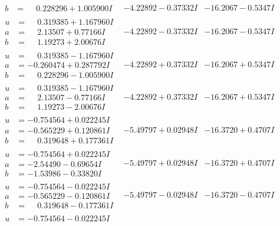 \documentclass[1p]{elsarticle_modified}
\theoremstyle{definition}
\begin{document}
$$\begin{array}{c|c|c}
\begin{aligned}
b &= \phantom{-}0.228296 + 1.005900 I\end{aligned}
 & -4.22892 - 0.37332 I & -16.2067 - 0.5347 I \\ \hline\begin{aligned}
u &= \phantom{-}0.319385 + 1.167960 I \\
a &= \phantom{-}2.13507 + 0.77166 I \\
b &= \phantom{-}1.19273 + 2.00676 I\end{aligned}
 & -4.22892 - 0.37332 I & -16.2067 - 0.5347 I \\ \hline\begin{aligned}
u &= \phantom{-}0.319385 - 1.167960 I \\
a &= -0.260474 + 0.287792 I \\
b &= \phantom{-}0.228296 - 1.005900 I\end{aligned}
 & -4.22892 + 0.37332 I & -16.2067 + 0.5347 I \\ \hline\begin{aligned}
u &= \phantom{-}0.319385 - 1.167960 I \\
a &= \phantom{-}2.13507 - 0.77166 I \\
b &= \phantom{-}1.19273 - 2.00676 I\end{aligned}
 & -4.22892 + 0.37332 I & -16.2067 + 0.5347 I \\ \hline\begin{aligned}
u &= -0.754564 + 0.022245 I \\
a &= -0.565229 + 0.120861 I \\
b &= \phantom{-}0.319648 + 0.177361 I\end{aligned}
 & -5.49797 + 0.02948 I & -16.3720 + 0.4707 I \\ \hline\begin{aligned}
u &= -0.754564 + 0.022245 I \\
a &= -2.54490 - 0.69654 I \\
b &= -1.53986 - 0.33820 I\end{aligned}
 & -5.49797 + 0.02948 I & -16.3720 + 0.4707 I \\ \hline\begin{aligned}
u &= -0.754564 - 0.022245 I \\
a &= -0.565229 - 0.120861 I \\
b &= \phantom{-}0.319648 - 0.177361 I\end{aligned}
 & -5.49797 - 0.02948 I & -16.3720 - 0.4707 I \\ \hline\begin{aligned}
u &= -0.754564 - 0.022245 I \\

\end{aligned}
\end{array}$$
\end{document}
